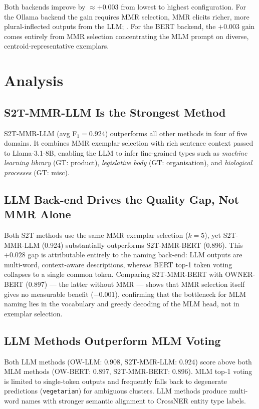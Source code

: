 \documentclass[11pt,a4paper]{article}
\begin{document}
Both backends improve by ${\approx}+0.003$ from lowest to highest configuration.
For the Ollama backend the gain requires MMR selection, MMR elicits richer, more plural-inflected outputs from
the LLM; .
For the BERT backend, the $+0.003$ gain comes entirely from MMR selection concentrating the MLM
prompt on diverse, centroid-representative exemplars.

\section{Analysis}

\subsection{S2T-MMR-LLM Is the Strongest Method}

S2T-MMR-LLM (avg F$_1{=}0.924$) outperforms all other methods in four
of five domains. It combines MMR exemplar selection with rich sentence context
passed to Llama-3.1-8B, enabling the LLM to infer fine-grained types such as
\textit{machine learning library} (GT: product), \textit{legislative body}
(GT: organisation), and \textit{biological processes} (GT: misc).

\subsection{LLM Back-end Drives the Quality Gap, Not MMR Alone}

Both S2T methods use the same MMR exemplar selection ($k{=}5$), yet
S2T-MMR-LLM (0.924) substantially outperforms S2T-MMR-BERT (0.896).
This $+0.028$ gap is attributable entirely to the naming back-end:
LLM outputs are multi-word, context-aware descriptions, whereas BERT
top-1 token voting collapses to a single common token.
Comparing S2T-MMR-BERT with OWNER-BERT (0.897) — the latter without MMR —
shows that MMR selection itself gives no measurable benefit ($-0.001$),
confirming that the bottleneck for MLM naming lies in the vocabulary
and greedy decoding of the MLM head, not in exemplar selection.

\subsection{LLM Methods Outperform MLM Voting}

Both LLM methods (OW-LLM: 0.908, S2T-MMR-LLM: 0.924) score above both
MLM methods (OW-BERT: 0.897, S2T-MMR-BERT: 0.896).
MLM top-1 voting is limited to single-token outputs and frequently falls
back to degenerate predictions (\texttt{vegetarian}) for ambiguous clusters.
LLM methods produce multi-word names with stronger semantic alignment
to CrossNER entity type labels.
\end{document}
